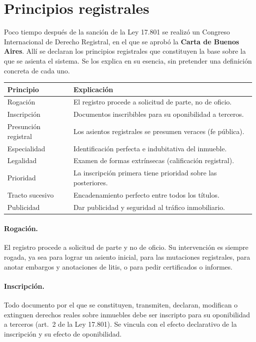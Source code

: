 \documentclass[12pt,oneside]{book}
\begin{document}
\section{Principios registrales}

Poco tiempo después de la sanción de la Ley 17.801 se realizó un Congreso Internacional de Derecho Registral, en el que se aprobó la \textbf{Carta de Buenos Aires}. Allí se declaran los principios registrales que constituyen la base sobre la que se asienta el sistema. Se los explica en su esencia, sin pretender una definición concreta de cada uno.

\begin{table}[H]
\centering
\begin{tabularx}{\textwidth}{@{}>{\raggedright\arraybackslash}p{}>{\raggedright\arraybackslash}X@{}}
\toprule
\textbf{Principio} & \textbf{Explicación} \\
\midrule
Rogación & El registro procede a solicitud de parte, no de oficio. \\
Inscripción & Documentos inscribibles para su oponibilidad a terceros. \\
Presunción registral & Los asientos registrales se presumen veraces (fe pública). \\
Especialidad & Identificación perfecta e indubitativa del inmueble. \\
Legalidad & Examen de formas extrínsecas (calificación registral). \\
Prioridad & La inscripción primera tiene prioridad sobre las posteriores. \\
Tracto sucesivo & Encadenamiento perfecto entre todos los títulos. \\
Publicidad & Dar publicidad y seguridad al tráfico inmobiliario. \\
\bottomrule
\end{tabularx}
\end{table}

\paragraph{Rogación.} El registro procede a solicitud de parte y no de oficio. Su intervención es siempre rogada, ya sea para lograr un asiento inicial, para las mutaciones registrales, para anotar embargos y anotaciones de litis, o para pedir certificados o informes.

\paragraph{Inscripción.} Todo documento por el que se constituyen, transmiten, declaran, modifican o extinguen derechos reales sobre inmuebles debe ser inscripto para su oponibilidad a terceros (art.~2 de la Ley 17.801). Se vincula con el efecto declarativo de la inscripción y su efecto de oponibilidad.
\end{document}
